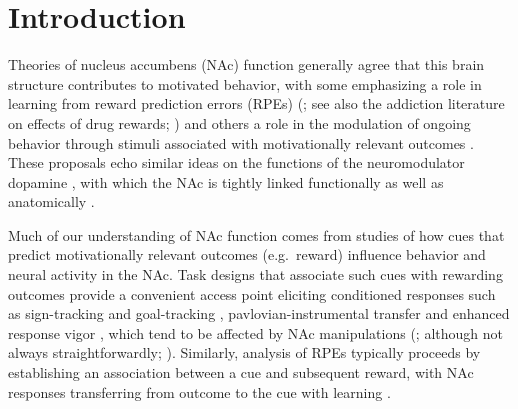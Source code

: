 \documentclass[11pt]{article}
\let\cite=\citep
\let\citeNP=\citealt
\begin{document}
\newpage

\section*{Introduction}

Theories of nucleus accumbens (NAc) function generally agree that this
brain structure contributes to motivated behavior, with some
emphasizing a role in learning from reward prediction errors (RPEs)
(\citeNP{Joel2002,Maia2009,Khamassi2012,Lee2012,Schultz2016,Averbeck2017};
see also the addiction literature on effects of drug rewards;
\citeNP{Kalivas2005,Hyman2006,Carelli2009}) and others a role in the
modulation of ongoing behavior through stimuli associated with
motivationally relevant outcomes \cite[invigorating,
  directing;][]{Nicola2010a,Salamone2012,Floresco2015}. These
proposals echo similar ideas on the functions of the neuromodulator
dopamine \cite{Maia2009,Berridge2012,Salamone2012,Schultz2016}, with
which the NAc is tightly linked functionally as well as anatomically
\cite{Cheer2007,Ikemoto2007,DuHoffmann2014,Takahashi2016}.

Much of our understanding of NAc function comes from studies of how
cues that predict motivationally relevant outcomes (e.g.\ reward)
influence behavior and neural activity in the NAc. Task designs that
associate such cues with rewarding outcomes provide a convenient
access point eliciting conditioned responses such as sign-tracking and
goal-tracking \cite{hearst1974sign,Robinson2009},
pavlovian-instrumental transfer \cite{Estes1943,Rescorla1967} and
enhanced response vigor \cite{Niv2007,Nicola2010a}, which tend to be
affected by NAc manipulations
(\citeNP{Corbit2011,Flagel2011,Chang2012}; although not always
straightforwardly; \citeNP{Giertler2004,Chang2013}). Similarly,
analysis of RPEs typically proceeds by establishing an association
between a cue and subsequent reward, with NAc responses transferring
from outcome to the cue with learning
\cite{Schultz1997,Setlow2003,Roitman2005,Day2007a}.
\end{document}
